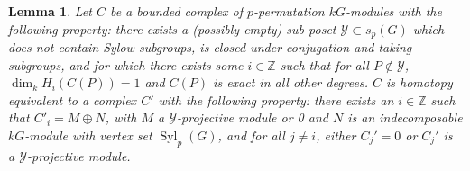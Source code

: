 \documentclass[10pt,letterpaper, boxed, cm]{amsart}
\newcommand{\Z}{\mathbb{Z}}
\newcommand{\Syl}{\operatorname{Syl}}
\newcommand{\calY}{\mathcal{Y}}
\newtheorem{lemma}[theorem]{Lemma}
\theoremstyle{remark}
\theoremstyle{definition}
\begin{document}
     \begin{lemma}\label{relprojectivitylimitingthm}
        Let $C$ be a bounded complex of $p$-permutation $kG$-modules with the following property: there exists a (possibly empty) sub-poset $\calY \subset s_p(G)$ which does not contain Sylow subgroups, is closed under conjugation and taking subgroups, and for which there exists some $i \in \Z$ such that for all $P \not\in \calY$, $\dim_k H_i(C(P)) = 1$ and $C(P)$ is exact in all other degrees. $C$ is homotopy equivalent to a complex $C'$ with the following property: there exists an $i \in \Z$ such that $C'_i = M \oplus N$, with $M$ a $\calY$-projective module or 0 and $N$ is an indecomposable $kG$-module with vertex set $\Syl_p(G)$, and for all $j \neq i$, either $C_j' = 0$ or $C_j'$ is a $\calY$-projective module.
	\end{lemma}
\end{document}
